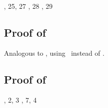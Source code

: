 \begin{derivation}
     {\Reapp, 25, 27}
     {\Reabs, 28}
      {\Reabsalpha, 29}
\end{derivation}



\subsection*{Proof of }

Analogous to , using \ReexIop\ instead of \Refaop.



\subsection*{Proof of }

\begin{derivation}
\step{\hasty{\cx,\vdecO}{\expr}{\bool}}{\hyp}
     {\Reabsalpha, 2, 3}
     {\Reapp, 7, 4}
\end{derivation}


